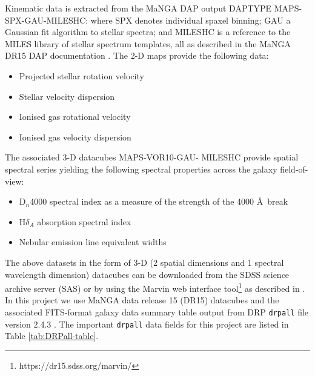 Kinematic data is extracted from the MaNGA DAP output DAPTYPE MAPS-SPX-GAU-MILESHC: where SPX denotes individual spaxel binning; GAU a Gaussian fit algorithm to stellar spectra; and MILESHC is a reference to the MILES library \citep{2011A&A...532A..95F} of stellar spectrum templates, all as described in the MaNGA DR15 DAP documentation \citet{2019arXiv190100856W}. The 2-D maps provide the following data: 

\begin{itemize}
    \item Projected stellar rotation velocity
    \item Stellar velocity dispersion
    \item Ionised gas rotational velocity
    \item Ionised gas velocity dispersion
\end{itemize}

The associated 3-D datacubes MAPS-VOR10-GAU-
MILESHC provide spatial spectral series yielding the following spectral properties across the galaxy field-of-view:

\begin{itemize}
    \item D$_n$4000 spectral index as a measure of the strength of the 4000 \AA\ break
    \item H$\delta_A$ absorption spectral index
    \item Nebular emission line equivalent widths
\end{itemize}

The above datasets in the form of 3-D (2 spatial dimensions and 1 spectral wavelength dimension) datacubes can be downloaded from the SDSS science archive server (SAS) or by using the Marvin web interface tool\footnote{https://dr15.sdss.org/marvin/} as described in \cite{2018arXiv181203833C}. In this project we use MaNGA data release 15 (DR15) datacubes \citep{2019ApJS..240...23A} and the associated FITS-format galaxy data summary table output from DRP \texttt{drpall} file version 2.4.3 \citep{2016AJ....152...83L}. The important \texttt{drpall} data fields for this project are listed in Table \ref{tab:DRPall-table}.

